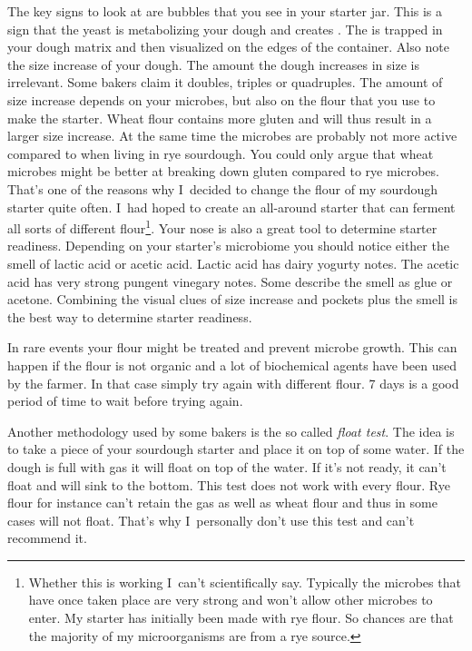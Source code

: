 The key signs to look at are bubbles that you see in your starter
jar. This is a sign that the yeast is metabolizing your
dough and creates . The  is trapped in your dough
matrix and then visualized on the edges of the container.
Also note the size increase of your dough. The amount the dough increases
in size is irrelevant. Some bakers claim it doubles, triples or quadruples.
The amount of size increase depends on your microbes, but also on
the flour that you use to make the starter. Wheat flour contains
more gluten and will thus result in a larger size increase. At
the same time the microbes are probably not more active compared
to when living in rye sourdough. You could only argue that
wheat microbes might be better at breaking down gluten compared
to rye microbes. That's one of the reasons why I~decided to change
the flour of my sourdough starter quite often. I~had hoped to create
an all-around starter that can ferment all sorts of different
flour\footnote{Whether this is working I~can't scientifically say.
Typically the microbes that have once taken place are very strong
and won't allow other microbes to enter. My starter has initially
been made with rye flour. So chances are that the majority of
my microorganisms are from a rye source.}. Your nose is also
a great tool to determine starter readiness. Depending on
your starter's microbiome you should notice either the smell
of lactic acid or acetic acid. Lactic acid has dairy yogurty notes.
The acetic acid has very strong pungent vinegary notes. Some
describe the smell as glue or acetone. Combining the visual clues
of size increase and pockets plus the smell is the best way
to determine starter readiness.

In rare events your flour might be treated and prevent microbe growth.
This can happen if the flour is not organic and a lot of biochemical
agents have been used by the farmer. In that case simply try again
with different flour. 7 days is a good period of time to wait before
trying again.

Another methodology used by some bakers is the so called \emph{float test}.
The idea is to take a piece of your sourdough starter and place it
on top of some water. If the dough is full with gas it will float
on top of the water. If it's not ready, it can't float and will
sink to the bottom. This test does not work with every flour.
Rye flour for instance can't retain the gas as well as wheat flour
and thus in some cases will not float. That's why I~personally
don't use this test and can't recommend it.

